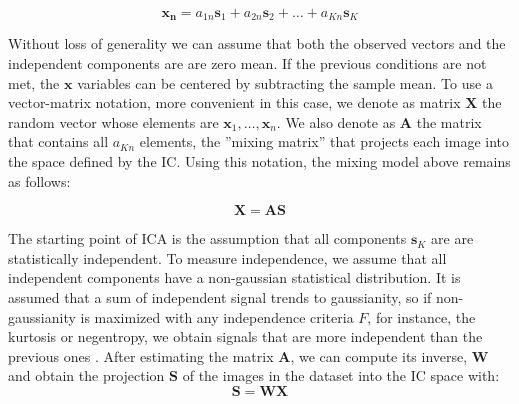 \begin{equation}
\mathbf{x_n} = a_{1n}\mathbf{s}_1 + a_{2n}\mathbf{s}_2 + \ldots + a_{Kn}\mathbf{s}_K
\end{equation}

Without loss of generality we can assume that both the observed vectors and the independent components are are zero mean. If the previous conditions are not met, the $\mathbf{x}$ variables can be centered by subtracting the sample mean. To use a vector-matrix notation, more convenient in this case, we denote as matrix $\mathbf{X}$ the random vector whose elements are $\mathbf{x}_1, \ldots, \mathbf{x}_n$. We also denote as $\mathbf{A}$ the matrix that contains all $a_{Kn}$ elements, the ''mixing matrix'' that projects each image into the space defined by the IC. Using this notation, the mixing model above remains as follows: 

\begin{equation}\label{eq:ica}
\mathbf{X}=\mathbf{A}\mathbf{S}
\end{equation}

The starting point of ICA is the assumption that all components $\mathbf{s}_K$ are are statistically independent. To measure independence, we assume that all independent components have a non-gaussian statistical distribution. It is assumed that a sum of independent signal trends to gaussianity, so if non-gaussianity is maximized with any independence criteria $F$, for instance, the kurtosis or negentropy, we obtain signals that are more independent than the previous ones \cite{Hyvarinen1999,Hyvarinen2000}.
After estimating the matrix $\mathbf{A}$, we can compute its inverse, $\mathbf{W}$ and obtain the projection $\mathbf{S}$ of the images in the dataset into the IC space with: 
\begin{equation}
\mathbf{S} = \mathbf{W}\mathbf{X}
\end{equation}

